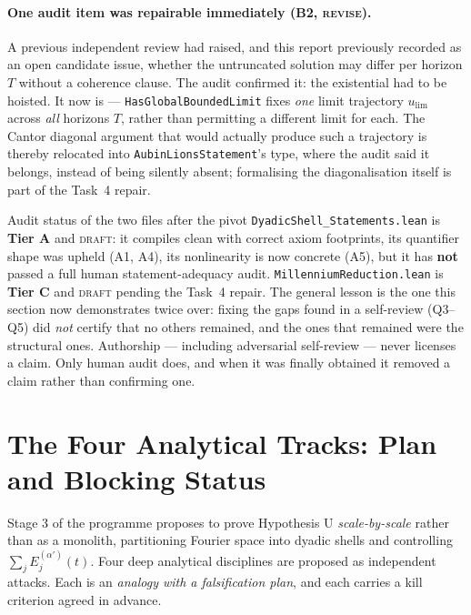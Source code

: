 \documentclass[11pt,a4paper]{article}
\newcommand{\tA}{\textcolor{TierA}{\textbf{Tier A}}}
\newcommand{\tC}{\textcolor{TierC}{\textbf{Tier C}}}
\theoremstyle{definition}
\theoremstyle{plain}
\begin{document}
\paragraph{One audit item was repairable immediately (B2, \textsc{revise}).} A previous
independent review had raised, and this report previously recorded as an open candidate issue,
whether the untruncated solution may differ per horizon $T$ without a coherence clause. The
audit confirmed it: the existential had to be hoisted. It now is --- \texttt{HasGlobalBoundedLimit}
fixes \emph{one} limit trajectory $u_{\lim}$ across \emph{all} horizons $T$, rather than
permitting a different limit for each. The Cantor diagonal argument that would actually produce
such a trajectory is thereby relocated into \texttt{AubinLionsStatement}'s type, where the audit
said it belongs, instead of being silently absent; formalising the diagonalisation itself is
part of the Task~4 repair.

\begin{warnbox}{Audit status of the two files after the pivot}
\texttt{DyadicShell\_Statements.lean} is \tA{} and \textsc{draft}: it compiles clean with
correct axiom footprints, its quantifier shape was upheld (A1, A4), its nonlinearity is now
concrete (A5), but it has \textbf{not} passed a full human statement-adequacy audit.
\texttt{MillenniumReduction.lean} is \tC{} and \textsc{draft} pending the Task~4 repair. The
general lesson is the one this section now demonstrates twice over: fixing the gaps found in a
self-review (Q3--Q5) did \emph{not} certify that no others remained, and the ones that remained
were the structural ones. Authorship --- including adversarial self-review --- never licenses a
claim. Only human audit does, and when it was finally obtained it removed a claim rather than
confirming one.
\end{warnbox}

\section{The Four Analytical Tracks: Plan and Blocking Status}
\label{sec:tracks}

Stage 3 of the programme proposes to prove Hypothesis U \emph{scale-by-scale} rather than as a
monolith, partitioning Fourier space into dyadic shells and controlling
$\sum_j E_j^{(\alpha')}(t)$. Four deep analytical disciplines are proposed as independent
attacks. Each is an \emph{analogy with a falsification plan}, and each carries a kill
criterion agreed in advance.
\end{document}
